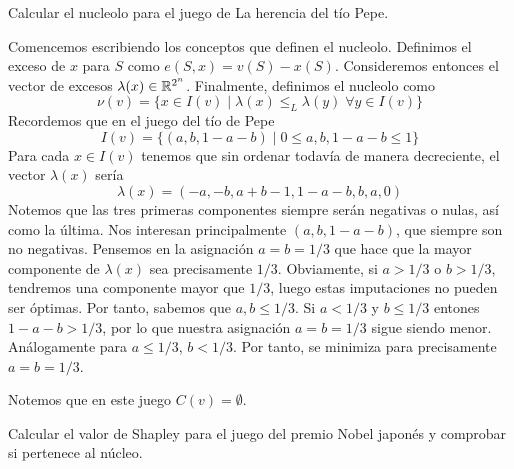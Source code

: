 \documentclass[twoside]{article}
\begin{document}
\newpage
\begin{ejercicio}{6}
Calcular el nucleolo para el juego de La herencia del tío Pepe. 
\end{ejercicio}
\begin{solucion}
Comencemos escribiendo los conceptos que definen el nucleolo. Definimos el exceso de $x$ para $S$ como $e(S,x) = v(S)-x(S)$. Consideremos entonces el vector de excesos $\lambda(x) \in \mathbb{R}^{2^n}$. Finalmente, definimos el nucleolo como
$$
\nu(v)=\{x\in I(v) \mid \lambda(x)\leq_L\lambda(y) \;\forall y \in I(v)\}
$$
Recordemos que en el juego del tío de Pepe
$$
I(v) = \{(a,b,1-a-b) \mid  0\leq a,b,1-a-b\leq 1\}
$$
Para cada $x\in I(v)$ tenemos que sin ordenar todavía de manera decreciente, el vector $\lambda(x)$ sería
$$
\lambda(x) =(-a,-b,a+b-1,1-a-b,b,a,0)
$$ 
Notemos que las tres primeras componentes siempre serán negativas o nulas, así como la última. Nos interesan principalmente $(a,b,1-a-b)$, que siempre son no negativas. Pensemos en la asignación $a=b=1/3$  que hace que la mayor componente de $\lambda(x)$ sea precisamente $1/3$. Obviamente, si $a>1/3$ o $b>1/3$, tendremos una componente mayor que $1/3$, luego estas imputaciones no pueden ser óptimas. Por tanto, sabemos que $a,b\leq 1/3$. Si $a<1/3$ y $b\leq 1/3$ entones $1-a-b> 1/3$, por lo que nuestra asignación $a=b=1/3$ sigue siendo menor. Análogamente para $a\leq 1/3$, $b<1/3$. Por tanto, se minimiza para precisamente $a=b=1/3$.

Notemos que en este juego $C(v)=\emptyset$. 
\end{solucion}
\newpage
\begin{ejercicio}{7}
Calcular el valor de Shapley para el juego del premio Nobel japonés y comprobar si pertenece al núcleo.
\end{ejercicio}
\end{document}
